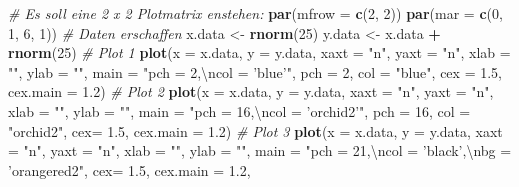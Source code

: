 \documentclass[
]{book}
\newenvironment{Shaded}{\begin{snugshade}}{\end{snugshade}}
\newcommand{\CharTok}[1]{\textcolor[rgb]{0.31,0.60,0.02}{#1}}
\newcommand{\CommentTok}[1]{\textcolor[rgb]{0.56,0.35,0.01}{\textit{#1}}}
\newcommand{\DataTypeTok}[1]{\textcolor[rgb]{0.13,0.29,0.53}{#1}}
\newcommand{\DecValTok}[1]{\textcolor[rgb]{0.00,0.00,0.81}{#1}}
\newcommand{\FloatTok}[1]{\textcolor[rgb]{0.00,0.00,0.81}{#1}}
\newcommand{\KeywordTok}[1]{\textcolor[rgb]{0.13,0.29,0.53}{\textbf{#1}}}
\newcommand{\NormalTok}[1]{#1}
\newcommand{\OperatorTok}[1]{\textcolor[rgb]{0.81,0.36,0.00}{\textbf{#1}}}
\newcommand{\StringTok}[1]{\textcolor[rgb]{0.31,0.60,0.02}{#1}}
\begin{document}
\begin{Shaded}
\begin{Highlighting}[]
\CommentTok{# Es soll eine 2 x 2 Plotmatrix enstehen:}
\KeywordTok{par}\NormalTok{(}\DataTypeTok{mfrow =} \KeywordTok{c}\NormalTok{(}\DecValTok{2}\NormalTok{, }\DecValTok{2}\NormalTok{))}
\KeywordTok{par}\NormalTok{(}\DataTypeTok{mar =} \KeywordTok{c}\NormalTok{(}\DecValTok{0}\NormalTok{, }\DecValTok{1}\NormalTok{, }\DecValTok{6}\NormalTok{, }\DecValTok{1}\NormalTok{))}
\CommentTok{# Daten erschaffen}
\NormalTok{x.data <-}\StringTok{ }\KeywordTok{rnorm}\NormalTok{(}\DecValTok{25}\NormalTok{)}
\NormalTok{y.data <-}\StringTok{ }\NormalTok{x.data }\OperatorTok{+}\StringTok{ }\KeywordTok{rnorm}\NormalTok{(}\DecValTok{25}\NormalTok{)}
\CommentTok{# Plot 1}
\KeywordTok{plot}\NormalTok{(}\DataTypeTok{x =}\NormalTok{ x.data, }\DataTypeTok{y =}\NormalTok{ y.data, }\DataTypeTok{xaxt =} \StringTok{"n"}\NormalTok{, }\DataTypeTok{yaxt =} \StringTok{"n"}\NormalTok{, }\DataTypeTok{xlab =} \StringTok{""}\NormalTok{, }\DataTypeTok{ylab =} \StringTok{""}\NormalTok{, }\DataTypeTok{main =} \StringTok{"pch = 2,}\CharTok{\textbackslash{}n}\StringTok{col = 'blue'"}\NormalTok{, }
     \DataTypeTok{pch =} \DecValTok{2}\NormalTok{, }\DataTypeTok{col =} \StringTok{"blue"}\NormalTok{, }\DataTypeTok{cex =} \FloatTok{1.5}\NormalTok{, }\DataTypeTok{cex.main =} \FloatTok{1.2}\NormalTok{)}
\CommentTok{# Plot 2}
\KeywordTok{plot}\NormalTok{(}\DataTypeTok{x =}\NormalTok{ x.data, }\DataTypeTok{y =}\NormalTok{ y.data, }\DataTypeTok{xaxt =} \StringTok{"n"}\NormalTok{, }\DataTypeTok{yaxt =} \StringTok{"n"}\NormalTok{, }\DataTypeTok{xlab =} \StringTok{""}\NormalTok{, }\DataTypeTok{ylab =} \StringTok{""}\NormalTok{, }\DataTypeTok{main =} \StringTok{"pch = 16,}\CharTok{\textbackslash{}n}\StringTok{col = 'orchid2'"}\NormalTok{, }
     \DataTypeTok{pch =} \DecValTok{16}\NormalTok{, }\DataTypeTok{col =} \StringTok{"orchid2"}\NormalTok{, }\DataTypeTok{cex=} \FloatTok{1.5}\NormalTok{, }\DataTypeTok{cex.main =} \FloatTok{1.2}\NormalTok{)}
\CommentTok{# Plot 3}
\KeywordTok{plot}\NormalTok{(}\DataTypeTok{x =}\NormalTok{ x.data, }\DataTypeTok{y =}\NormalTok{ y.data, }\DataTypeTok{xaxt =} \StringTok{"n"}\NormalTok{, }\DataTypeTok{yaxt =} \StringTok{"n"}\NormalTok{, }\DataTypeTok{xlab =} \StringTok{""}\NormalTok{, }\DataTypeTok{ylab =} \StringTok{""}\NormalTok{, }\DataTypeTok{main =} \StringTok{"pch = 21,}\CharTok{\textbackslash{}n}\StringTok{col = 'black',}\CharTok{\textbackslash{}n}\StringTok{bg = 'orangered2"}\NormalTok{, }
     \DataTypeTok{cex=} \FloatTok{1.5}\NormalTok{, }\DataTypeTok{cex.main =} \FloatTok{1.2}\NormalTok{, }

\end{Highlighting}
\end{Shaded}
\end{document}
